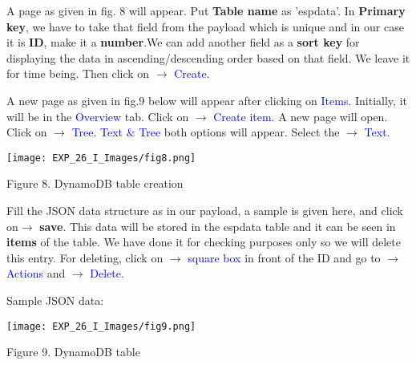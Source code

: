 \documentclass[12pt,a4paper]{article}
\begin{document}
\begin{justify}
\begin{itemize}
A page as given in fig. 8 will appear. Put \textbf{Table name} as 'espdata'. In \textbf{Primary key}, we have to take that field from the payload which is unique and in our case it is \textbf{ID}, make it a \textbf{number}.We can add another field as a \textbf{sort key} for displaying the data in ascending/descending order based on that field. We leave it for time being. Then click on $ \rightarrow $ \textcolor{blue}{Create}.\par

A new page as given in fig.9  below will appear after clicking on \textcolor{blue}{Items}. Initially, it will be in the \textcolor{blue}{Overview} tab. Click on $ \rightarrow $ \textcolor{blue}{Create item}. A new page will open. Click on $ \rightarrow $ \textcolor{blue}{Tree. Text \& Tree} both options will appear. Select the $ \rightarrow $ \textcolor{blue}{Text}.



\begin{center} 
\texttt{[image: EXP\_26\_I\_Images/fig8.png]}
\end{center}
\vspace{-10mm}
\begin{center} {Figure 8. DynamoDB table creation }\end{center}



Fill the JSON data structure as in our payload, a sample is given here, and click on$ \rightarrow $ \textbf{save}. This data will be stored in the espdata table and it can be seen in \textbf{items} of the table. We have done it for checking purposes only so we will delete this entry. For deleting, click on $ \rightarrow $ \textcolor{blue}{square box} in front of the ID and go to $ \rightarrow $ \textcolor{blue}{Actions} and  $ \rightarrow $ \textcolor{blue}{Delete}. 

\begin{center}
     Sample JSON data:\\[4pt]
\end{center}

\begin{center} 
\texttt{[image: EXP\_26\_I\_Images/fig9.png]}
\end{center}
\vspace{-10mm}
\begin{center} {Figure 9. DynamoDB table }\end{center}



\end{itemize}
\end{justify}
\end{document}
